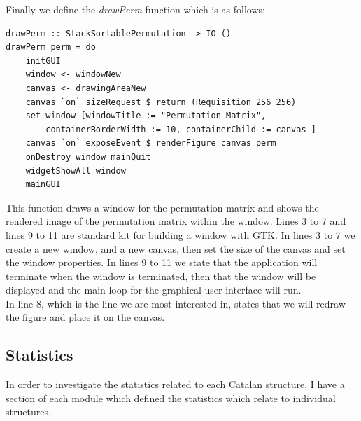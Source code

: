 \documentclass[12pt]{article}
\begin{document}
Finally we define the {\it drawPerm} function which is as follows:
\begin{lstlisting}
drawPerm :: StackSortablePermutation -> IO ()
drawPerm perm = do
	initGUI
	window <- windowNew
	canvas <- drawingAreaNew
	canvas `on` sizeRequest $ return (Requisition 256 256)
	set window [windowTitle := "Permutation Matrix",
		containerBorderWidth := 10, containerChild := canvas ]
	canvas `on` exposeEvent $ renderFigure canvas perm
	onDestroy window mainQuit
	widgetShowAll window
	mainGUI
\end{lstlisting}
This function draws a window for the permutation matrix and shows the rendered image of the permutation matrix within the window. Lines 3 to 7 and lines 9 to 11 are standard kit for building a window with GTK. In lines 3 to 7 we create a new window, and a new canvas, then set the size of the canvas and set the window properties. In lines 9 to 11 we state that the application will terminate when the window is terminated, then that the window will be displayed and the main loop for the graphical user interface will run.\\
In line 8, which is the line we are most interested in, states that we will redraw the figure and place it on the canvas.


\subsection{Statistics}
In order to investigate the statistics related to each Catalan structure, I have a section of each module which defined the statistics which relate to individual structures.\\
\end{document}
